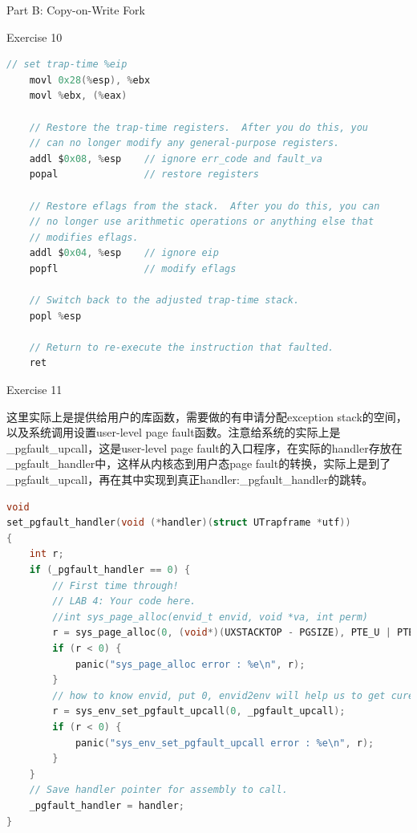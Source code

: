 \documentclass[GBK,winfonts,a4paper,10pt]{ctexart}
\begin{document}
\begin{section}{Part B: Copy-on-Write Fork}
\begin{subsection}{Exercise 10}
\begin{lstlisting}[language=C]
	// set trap-time %eip
	movl 0x28(%esp), %ebx
	movl %ebx, (%eax)

	// Restore the trap-time registers.  After you do this, you
	// can no longer modify any general-purpose registers.
	addl $0x08, %esp 	// ignore err_code and fault_va
	popal 				// restore registers

	// Restore eflags from the stack.  After you do this, you can
	// no longer use arithmetic operations or anything else that
	// modifies eflags.
	addl $0x04, %esp 	// ignore eip 
	popfl				// modify eflags

	// Switch back to the adjusted trap-time stack.
	popl %esp

	// Return to re-execute the instruction that faulted.
	ret
\end{lstlisting}
\end{subsection}

\begin{subsection}{Exercise 11}
\par
这里实际上是提供给用户的库函数，需要做的有申请分配exception stack的空间，以及系统调用设置user-level page fault函数。注意给系统的实际上是\_pgfault\_upcall，这是user-level page fault的入口程序，在实际的handler存放在\_pgfault\_handler中，这样从内核态到用户态page fault的转换，实际上是到了\_pgfault\_upcall，再在其中实现到真正handler:\_pgfault\_handler的跳转。
\begin{lstlisting}[language=C]
void
set_pgfault_handler(void (*handler)(struct UTrapframe *utf))
{
	int r;
	if (_pgfault_handler == 0) {
		// First time through!	
		// LAB 4: Your code here.
		//int sys_page_alloc(envid_t envid, void *va, int perm)
		r = sys_page_alloc(0, (void*)(UXSTACKTOP - PGSIZE), PTE_U | PTE_W | PTE_P);
		if (r < 0) {
			panic("sys_page_alloc error : %e\n", r);
		}
		// how to know envid, put 0, envid2env will help us to get curenv in syscall
		r = sys_env_set_pgfault_upcall(0, _pgfault_upcall);		
		if (r < 0) {
			panic("sys_env_set_pgfault_upcall error : %e\n", r);
		}
	}
	// Save handler pointer for assembly to call.
	_pgfault_handler = handler;
}
\end{lstlisting}
\end{subsection}


\end{section}
\end{document}

